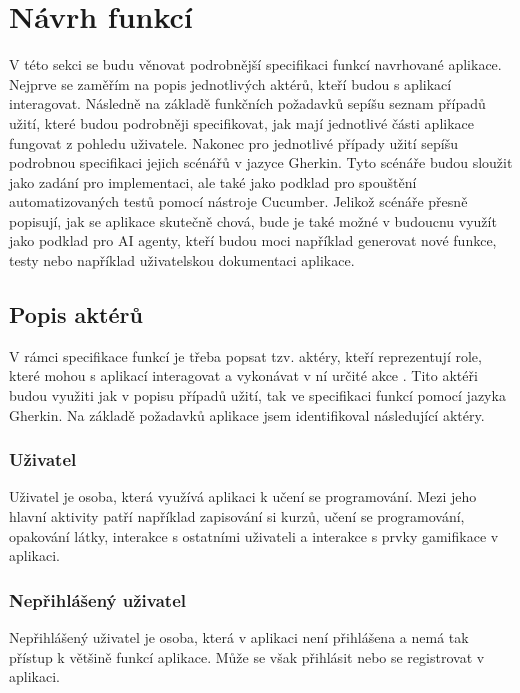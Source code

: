 ﻿%
\section{Návrh funkcí}

V této sekci se budu věnovat podrobnější specifikaci funkcí navrhované aplikace. Nejprve se zaměřím na popis jednotlivých aktérů, kteří budou s aplikací interagovat. Následně na základě funkčních požadavků sepíšu seznam případů užití, které budou podrobněji specifikovat, jak mají jednotlivé části aplikace fungovat z pohledu uživatele. Nakonec pro jednotlivé případy užití sepíšu podrobnou specifikaci jejich scénářů v jazyce Gherkin. Tyto scénáře budou sloužit jako zadání pro implementaci, ale také jako podklad pro spouštění automatizovaných testů pomocí nástroje Cucumber. Jelikož scénáře přesně popisují, jak se aplikace skutečně chová, bude je také možné v budoucnu využít jako podklad pro AI agenty, kteří budou moci například generovat nové funkce, testy nebo například uživatelskou dokumentaci aplikace.

\subsection{Popis aktérů}

V rámci specifikace funkcí je třeba popsat tzv. aktéry, kteří reprezentují role, které mohou s aplikací interagovat a vykonávat v ní určité akce \cite[21-22]{UseCases}. Tito aktéři budou využiti jak v popisu případů užití, tak ve specifikaci funkcí pomocí jazyka Gherkin. Na základě požadavků aplikace jsem identifikoval následující aktéry.

\subsubsection{Uživatel}

Uživatel je osoba, která využívá aplikaci k učení se programování. Mezi jeho hlavní aktivity patří například zapisování si kurzů, učení se programování, opakování látky, interakce s ostatními uživateli a interakce s prvky gamifikace v aplikaci.

\subsubsection{Nepřihlášený uživatel}

Nepřihlášený uživatel je osoba, která v aplikaci není přihlášena a nemá tak přístup k většině funkcí aplikace. Může se však přihlásit nebo se registrovat v aplikaci.


